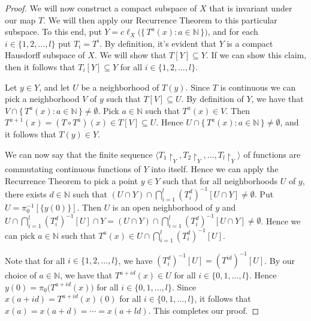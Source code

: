 \documentclass[12pt]{article}
\theoremstyle{plain}
\theoremstyle{definition}
\newcommand{\la}{\langle}
\newcommand{\ra}{\rangle}
\newcommand{\bbN}{\mathbb{N}}
\begin{document}
\begin{proof}
    We will now construct a compact subspace of $X$ that is invariant
    under our map $T$.
    We will then apply our Recurrence Theorem to this particular subspace.
    To this end, put $Y = c\ell_X\bigl(\{\, T^a(x) : a \in \bbN
    \,\}\bigr)$, and for each $i \in \{1, 2, \ldots, l\}$ put $T_i =
    T^i$. 
    By definition, it's evident that $Y$ is a compact Hausdorff
    subspace of $X$. 
    We will show that $T[Y] \subseteq Y$. 
    If we can show this claim, then it follows that $T_i[Y] \subseteq
    Y$ for all $i \in \{1, 2, \ldots, l\}$. 
    
    Let $y \in Y$, and let $U$ be a neighborhood of $T(y)$. 
    Since $T$ is continuous we can pick a neighborhood $V$ of $y$ such
    that $T[V] \subseteq U$. 
    By definition of $Y$, we have that $V \cap \{\, T^a(x) : a \in
    \bbN \,\} \ne \emptyset$. 
    Pick $a \in \bbN$ such that $T^a(x) \in V$. 
    Then $ T^{a+1}(x) = (T \circ T^a)(x) \in T[V] \subseteq U$.
    Hence $U \cap \{\, T^a(x) : a \in \bbN \,\} \ne \emptyset$, and it
    follows that $T(y) \in Y$. 

    We can now say that the finite sequence $\la T_1 \upharpoonright_Y
    , T_2 \upharpoonright_Y, \ldots, T_l \upharpoonright_Y
    \ra$ of functions are commutating continuous functions of $Y$ into
    itself.
    Hence we can apply the Recurrence Theorem to pick a point $y \in
    Y$ such that for all neighborhoods $U$ of $y$, there exists $d \in
    \bbN$ such that $(U \cap Y) \cap \bigcap_{i=1}^l (T_i^d)^{-1}[U
    \cap Y] \ne \emptyset$.
    Put $U = \pi_0^{-1}[\{y(0)\}]$. 
    Then $U$ is an open neighborhood of $y$ and 
    $U \cap \bigcap_{i=1}^l(T_i^d)^{-1}[U] \cap Y = (U \cap Y) \cap
    \bigcap_{i=1}^l (T_i^d)^{-1}[U \cap Y] \ne \emptyset$. 
    Hence we can pick $a \in \mathbb{N}$ such that $T^a(x) \in U \cap
    \bigcap_{i=1}^l(T_i^d)^{-1}[U]$. 
    
    Note that for all $i \in \{1, 2, \ldots, l\}$, we have
    $(T_i^d)^{-1}[U] = (T^{id})^{-1}[U]$. 
    By our choice of $a \in \bbN$, we have that $T^{a+id}(x) \in U$
    for all $i \in \{0, 1, \ldots, l\}$. 
    Hence $y(0) = \pi_0\bigl(T^{a+id}(x)\bigr)$ for all $i \in \{0, 1,
    \ldots, l\}$. 
    Since $x(a+id) = T^{a+id}(x)(0)$ for all $i \in \{0, 1, \ldots,
    l\}$, it follows that $x(a) = x(a + d) = \cdots = x(a+ ld)$. 
    This completes our proof.%
  \end{proof}
\end{document}
